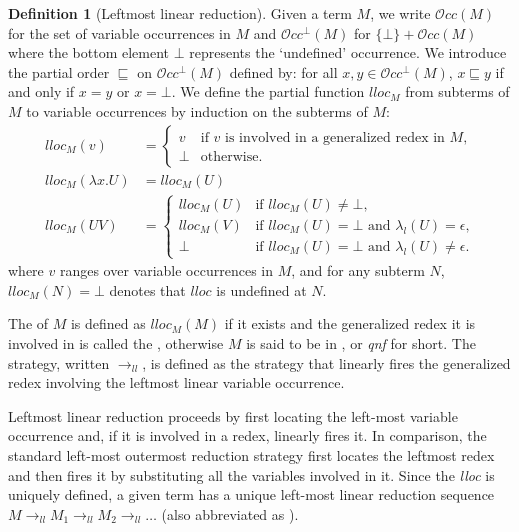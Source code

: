 \documentclass{elsarticle}
\theoremstyle{plain}
\theoremstyle{definition}
\newtheorem{definition}{Definition}[section]
\newcommand\VarOcc{\mathcal{O}{cc}}
\newcommand{\llred}{\rightarrow_{ll}}
\begin{document}
\begin{definition}[Leftmost linear reduction]
    \label{def:leftmostlinearreduction}
Given a term $M$, we write $\VarOcc(M)$ for the set of variable occurrences in $M$
and $\VarOcc^\bot(M)$ for $\{\bot \} + \VarOcc(M)$ where the bottom element $\bot$ represents the `undefined' occurrence. We introduce the partial order $\sqsubseteq$ on $\VarOcc^\bot(M)$ defined by: for all $x,y \in \VarOcc^\bot(M)$, $x \sqsubseteq y$ if and only if $x = y$ or $x = \bot$. We define the partial function $lloc_M$ from subterms of $M$ to variable occurrences by induction on the subterms of $M$:
\begin{align*}
lloc_M(v) &=
    \begin{cases}
    v &\mbox{if $v$ is involved in a generalized redex in $M$,} \\
    \bot & \mbox {otherwise.}
    \end{cases}  \\
lloc_M(\lambda x . U) &= lloc_M(U) \\
lloc_M(U V) &= \begin{cases}
                lloc_M(U) &\mbox{if $lloc_M(U)\neq\bot$,} \\
                lloc_M(V) &\mbox{if $lloc_M(U)=\bot$ and $\lambda_l(U) = \epsilon$,} \\
                \bot & \mbox{if $lloc_M(U)=\bot$ and $\lambda_l(U) \neq \epsilon$.}
              \end{cases}
\end{align*}
where $v$ ranges over variable occurrences in $M$,
and for any subterm $N$, $lloc_M(N) = \bot$ denotes that $lloc$ is undefined at $N$.

The  of $M$
is defined as $lloc_M(M)$ if it exists and the generalized redex it is involved in is called the , otherwise $M$ is said to be in , or \emph{qnf} for short.
The  strategy, written $\llred$, is defined as the strategy that linearly fires the generalized redex involving the leftmost linear variable occurrence.
\end{definition}
Leftmost linear reduction proceeds by first locating the left-most variable occurrence and, if it is involved in a redex, linearly fires it. In comparison, the standard left-most outermost reduction strategy first locates the leftmost redex and then fires it by substituting all the variables involved in it.
%
Since the \emph{lloc} is uniquely defined, a given term has a unique left-most linear reduction sequence $M \llred M_1 \llred M_2 \llred \ldots$ (also abbreviated as ).
\end{document}
